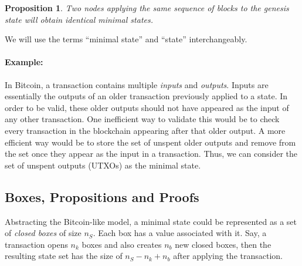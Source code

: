 \documentclass[]{report}   %
\newtheorem{proposition}{Proposition}
\begin{document}
	\begin{proposition}\label{prop1} Two nodes applying the same sequence of blocks to the genesis state will obtain identical minimal states.
	\end{proposition}	

We will use the terms ``minimal state'' and ``state'' interchangeably. 


\paragraph{Example:} In Bitcoin, a transaction contains multiple \textit{inputs} and \textit{outputs}. Inputs are essentially the outputs of an older transaction previously applied to a state. In order to be valid, these older outputs should not have appeared as the input of any other transaction. One inefficient way to validate this would be to check every transaction in the blockchain appearing after that older output. A more efficient way would be to store the set of unspent older outputs and remove from the set once they appear as the input in a transaction.
Thus, %
we can consider the set of unspent outputs (UTXOs) as the minimal state.

%

\subsection{Boxes, Propositions and Proofs}

Abstracting the Bitcoin-like model, a minimal state could be represented as a set of \textit{closed boxes} of size \(n_S\). Each box has a value associated with it. Say, a transaction opens \(n_k\) boxes and also creates \(n_b\) new closed boxes, then the resulting state set has the size of \(n_S-n_k+n_b\) after applying the transaction. 
\end{document}
